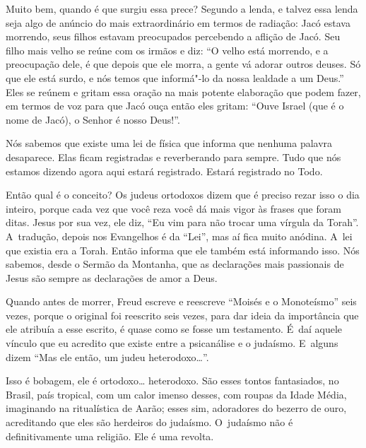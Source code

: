 

Muito bem, quando é que surgiu essa prece? Segundo a lenda, e talvez
essa lenda seja algo de anúncio do mais extraordinário em termos de
radiação: Jacó estava morrendo, seus filhos estavam preocupados
percebendo a aflição de Jacó. Seu filho mais velho se reúne com os
irmãos e diz: ``O velho está morrendo, e a preocupação dele, é que
depois que ele morra, a gente vá adorar outros deuses. Só que ele está
surdo, e nós temos que informá"-lo da nossa lealdade a um Deus.'' Eles se
reúnem e gritam essa oração na mais potente elaboração que podem fazer,
em termos de voz para que Jacó ouça então eles gritam: ``Ouve Israel
(que é o nome de Jacó), o Senhor é nosso Deus!''.

 

Nós sabemos que existe uma lei de física que informa que nenhuma palavra
desaparece. Elas ficam registradas e reverberando para sempre. Tudo que
nós estamos dizendo agora aqui estará registrado. Estará registrado no
Todo.

 

Então qual é o conceito? Os judeus ortodoxos dizem que é preciso rezar
isso o dia inteiro, porque cada vez que você reza você dá mais vigor às
frases que foram ditas. Jesus por sua vez, ele diz, ``Eu vim para não
trocar uma vírgula da Torah''. A~tradução, depois nos Evangelhos é da
``Lei'', mas aí fica muito anódina. A~lei que existia era a Torah. Então
informa que ele também está informando isso. Nós sabemos, desde o Sermão
da Montanha, que as declarações mais passionais de Jesus são sempre as
declarações de amor a Deus.

 

Quando antes de morrer, Freud escreve e reescreve ``Moisés e o
Monoteísmo'' seis vezes, porque o original foi reescrito seis vezes,
para dar ideia da importância que ele atribuía a esse escrito, é quase
como se fosse um testamento. É~daí aquele vínculo que eu acredito que
existe entre a psicanálise e o judaísmo. E~alguns dizem ``Mas ele então,
um judeu heterodoxo…''.

 

Isso é bobagem, ele é ortodoxo… heterodoxo. São esses tontos
fantasiados, no Brasil, país tropical, com um calor imenso desses, com
roupas da Idade Média, imaginando na ritualística de Aarão; esses sim,
adoradores do bezerro de ouro, acreditando que eles são herdeiros do
judaísmo. O~judaísmo não é definitivamente uma religião. Ele é uma
revolta.

 

